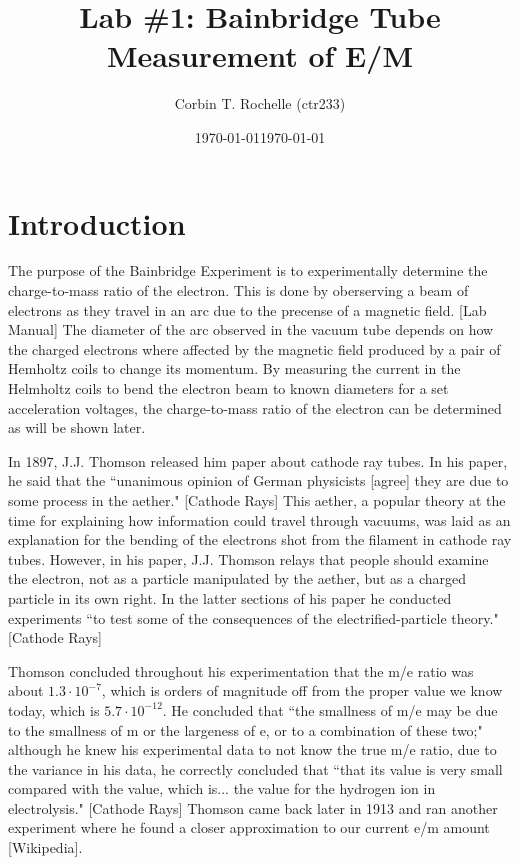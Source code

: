 \documentclass[aps,prl,10pt,twocolumn,floatfix]{revtex4-2}
\begin{document}
\begin{abstract}
\end{abstract}


\title{Lab \#1: Bainbridge Tube Measurement of E/M}
\author{Corbin T. Rochelle (ctr233)}
\date{\today}
\date{\today}

\maketitle

\section{Introduction}\label{Intro}

The purpose of the Bainbridge Experiment is to experimentally determine the charge-to-mass ratio of the electron.
This is done by oberserving a beam of electrons as they travel in an arc due to the precense of a magnetic field. [Lab Manual]
The diameter of the arc observed in the vacuum tube depends on how the charged electrons where affected by the magnetic field produced by a pair of Hemholtz coils to change its momentum.
By measuring the current in the Helmholtz coils to bend the electron beam to known diameters for a set acceleration voltages, the charge-to-mass ratio of the electron can be determined as will be shown later.

In 1897, J.J. Thomson released him paper about cathode ray tubes.
In his paper, he said that the ``unanimous opinion of German physicists [agree] they are due to some process in the aether." [Cathode Rays]
This aether, a popular theory at the time for explaining how information could travel through vacuums, was laid as an explanation for the bending of the electrons shot from the filament in cathode ray tubes.
However, in his paper, J.J. Thomson relays that people should examine the electron, not as a particle manipulated by the aether, but as a charged particle in its own right.
In the latter sections of his paper he conducted experiments ``to test some of the consequences of the electrified-particle theory." [Cathode Rays]

Thomson concluded throughout his experimentation that the m/e ratio was about $1.3\cdot 10^{-7}$, which is orders of magnitude off from the proper value we know today, which is $5.7\cdot 10^{-12}$.
He concluded that ``the smallness of m/e may be due to the smallness of m or the largeness of e, or to a combination
of these two;"
although he knew his experimental data to not know the true m/e ratio, due to the variance in his data, he correctly concluded that ``that its value is very small compared with the value, which is... the value for the hydrogen ion in electrolysis." [Cathode Rays]
Thomson came back later in 1913 and ran another experiment where he found a closer approximation to our current e/m amount [Wikipedia].
\end{document}
